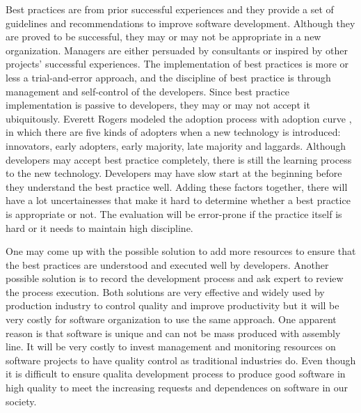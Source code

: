 Best practices are from prior successful experiences and they provide a set
of guidelines and recommendations to improve software development. Although
they are proved to be successful, they may or may not be appropriate in a
new organization. Managers are either persuaded by consultants or inspired
by other projects' successful experiences. The implementation of best
practices is more or less a trial-and-error approach, and the discipline of
best practice is through management and self-control of the developers.
Since best practice implementation is passive to developers, they may or
may not accept it ubiquitously. Everett Rogers modeled the adoption process
with adoption curve \cite{Potter:02}, in which there are five kinds of
adopters when a new technology is introduced: innovators, early adopters,
early majority, late majority and laggards. Although developers may accept
best practice completely, there is still the learning process to the new
technology.  Developers may have slow start at the beginning before they
understand the best practice well. Adding these factors together, there will
have a lot uncertainesses that make it hard to determine whether a best
practice is appropriate or not. The evaluation will be error-prone if the
practice itself is hard or it needs to maintain high discipline. 

One may come up with the possible solution to add more resources to ensure
that the best practices are understood and executed well by developers.
Another possible solution is to record the development process and ask
expert to review the process execution. Both solutions are very effective
and widely used by production industry to control quality and improve
productivity but it will be very costly for software organization to use
the same approach. One apparent reason is that software is unique and can
not be mass produced with assembly line. It will be very costly to invest
management and monitoring resources on software projects to have quality
control as traditional industries do. Even though it is difficult to ensure
qualita
development process to produce good software in high quality to meet the
increasing requests and dependences on software in our society.

